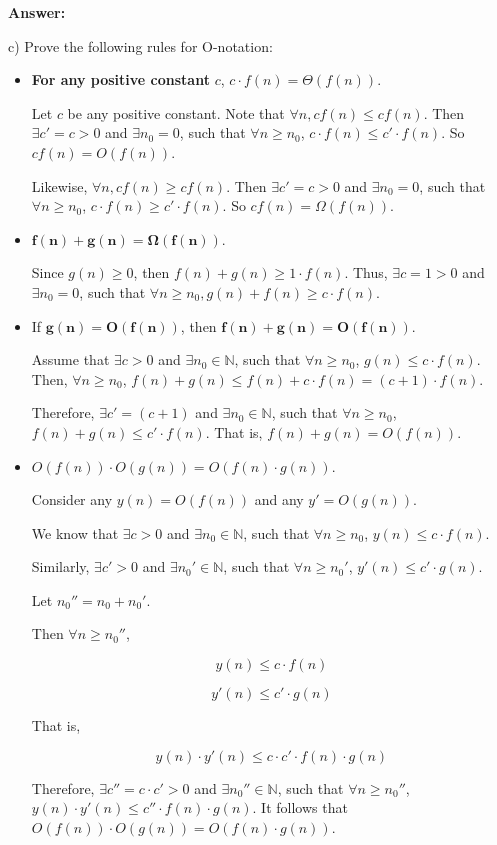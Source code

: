 \documentclass[a4paper]{article}
\begin{document}
\bigskip \noindent \textbf{Answer:}

\noindent c) Prove the following rules for O-notation:
\begin{itemize}
\item \textbf{For any positive constant} $c$, $c \cdot f(n) = \Theta(f(n))$.

Let $c$ be any positive constant. Note that $\forall n, c f(n) \le c f(n)$. Then $\exists c' = c > 0$ and $\exists n_0 = 0$, such that $\forall n \ge n_0$, $c\cdot f(n) \le c' \cdot f(n)$. So $c f(n) = O(f(n))$.

Likewise, $\forall n, c f(n) \ge c f(n)$. Then $\exists c' = c > 0$ and $\exists n_0 = 0$, such that $\forall n \ge n_0$, $c\cdot f(n) \ge c' \cdot f(n)$. So $c f(n) = \Omega(f(n))$.



\item $\mathbf{f(n) + g(n) = \Omega(f(n))}$.

Since $g(n) \ge 0$, then $f(n) + g(n) \ge 1 \cdot f(n)$. Thus, $\exists c = 1 > 0$ and $\exists n_0 = 0$, such that $\forall n \ge n_0, g(n) + f(n) \ge c \cdot f(n)$.

\item If $\mathbf{g(n) = O(f(n))}$, then $\mathbf{f(n) + g(n) = O(f(n))}$.

Assume that $\exists c > 0$ and $\exists n_0 \in 
\mathbb{N}$, such that $\forall n \ge n_0$, $g(n) \le c \cdot f(n)$.
Then, $\forall n \ge n_0$, $f(n) + g(n) \le f(n) + c \cdot f(n) = (c+1) \cdot f(n)$.

Therefore, $\exists c' = (c+1)$ and $\exists n_0 \in 
\mathbb{N}$, such that $\forall n \ge n_0$, $f(n) + g(n) \le c' \cdot f(n)$. That is, $f(n) + g(n) = O(f(n))$.


\item $O(f(n)) \cdot O(g(n)) = O(f(n) \cdot g(n))$.

Consider any $y(n) = O(f(n))$ and any $y' = O(g(n))$.

We know that $\exists c > 0$ and $\exists n_0 \in 
\mathbb{N}$, such that $\forall n \ge n_0$, $y(n) \le c \cdot f(n)$.

Similarly, $\exists c' > 0$ and $\exists n_0' \in 
\mathbb{N}$, such that $\forall n \ge n_0'$, $y'(n) \le c' \cdot g(n)$.

Let $n_0'' = n_0 + n_0'$.

Then $\forall n \ge n_0''$,

$$y(n) \le c \cdot f(n)$$

$$y'(n) \le c' \cdot g(n)$$

That is,

$$y(n) \cdot y'(n) \le c \cdot c' \cdot f(n) \cdot g(n)$$

Therefore, $\exists c'' = c \cdot c' > 0$ and $\exists n_0'' \in 
\mathbb{N}$, such that $\forall n \ge n_0''$, $y(n)\cdot y'(n) \le c'' \cdot f(n) \cdot g(n)$. It follows that $O(f(n)) \cdot O(g(n)) = O(f(n) \cdot g(n))$.

\end{itemize}
\end{document}

